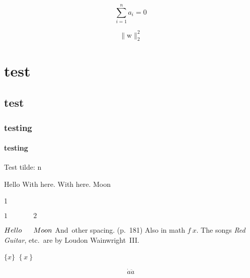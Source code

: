 \documentclass{minimal}
\begin{document}
\begin{equation}
  \sum_{i=1}^n a_i = 0
\end{equation}

$$\lVert \mathrm{w} \rVert_2^2$$

\chapter{test}

\section{test}

\subsection{testing}

\subsubsection{testing}

Test tilde: \tilde n

Hello
\thinspace
\medspace
\thickspace
\bigskip
\hspace{1em}
\hfill
\vspace{1em}
\vfill
With  here.
With  here.
Moon

1 \, \: \; \! \quad {}

$1 \, \: \; \! \quad \qquad 2$

$Hello
\thinspace
\medspace
\thickspace
\bigskip
\hspace{1em}
\hfill
\vspace{1em}
Moon$
And~other spacing. (p.~181) \citet[Sect.~3]{MyRef:2023}
Also in math $f~x$.
The songs \textit{Red Guitar}, etc.\ are by Loudon Wainwright~III\@.

$\{x\}$
$\left\{x\right\}$

\[
  \dot a
  \ddot a
\]
\end{document}
